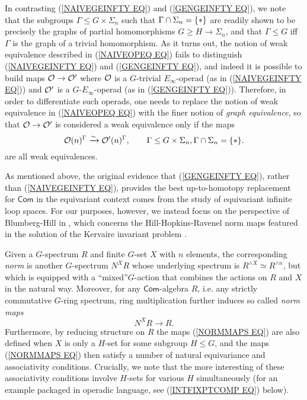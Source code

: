 \documentclass[a4paper,10pt]{article}%
\begin{document}
In contrasting 
(\ref{NAIVEGEINFTY EQ}) and (\ref{GENGEINFTY EQ}),
we note that 
the subgroups $\Gamma \leq G \times \Sigma_n$ such that $\Gamma \cap \Sigma_n = \{\**\}$ 
are readily shown to be precisely the graphs of partial homomorphisms 
$G \geq H \to \Sigma_n$,
and that $\Gamma \leq G$ iff $\Gamma$ is the graph of a trivial homomorphism. 
As it turns out, the notion of weak equivalence described in (\ref{NAIVEOPEQ EQ}) fails to distinguish
(\ref{NAIVEGEINFTY EQ}) and (\ref{GENGEINFTY EQ}), 
and indeed it is possible
to build maps $\mathcal{O} \to \mathcal{O}'$ where
$\mathcal{O}$ is a $G$-trivial $E_{\infty}$-operad (as in (\ref{NAIVEGEINFTY EQ}))
and $\mathcal{O}'$ is a $G$-$E_{\infty}$-operad 
(as in (\ref{GENGEINFTY EQ})).
Therefore, in order to differentiate such operads, one needs to replace the notion of weak equivalence in (\ref{NAIVEOPEQ EQ}) 
with the finer notion of \textit{graph equivalence}, 
so that $\mathcal{O} \to \mathcal{O}'$ is considered a weak equivalence only if
the maps
\begin{equation}\label{GENEOPEQ EQ}
	\O(n)^{\Gamma} \xrightarrow{\sim} \O'(n)^{\Gamma}, \qquad
	\Gamma \leq G\times \Sigma_n, \Gamma \cap \Sigma_n = \{\**\}.
\end{equation}
are all weak equivalences.

As mentioned above, the original evidence \cite{CW91}
that (\ref{GENGEINFTY EQ}), 
rather than (\ref{NAIVEGEINFTY EQ}), 
provides the best up-to-homotopy replacement for $\mathsf{Com}$ in the equivariant context comes from the study of equivariant infinite loop spaces. %
For our purposes, however, we instead focus on the perspective of Blumberg-Hill in \cite{BH15},
which concerns the Hill-Hopkins-Ravenel norm maps featured in the solution of the Kervaire invariant problem \cite{HHR}.

Given a $G$-spectrum $R$ and finite $G$-set $X$ with $n$ elements, 
the corresponding \textit{norm} is another $G$-spectrum $N^X R$
whose underlying spectrum is 
$R^{\wedge X} \simeq R^{\wedge n}$,
but which is equipped with a ``mixed''$G$-action that combines the actions on $R$ and $X$ in the natural way.
Moreover, for any $\mathsf{Com}$-algebra $R$, i.e.
any strictly commutative $G$-ring spectrum, 
ring multiplication further induces so called \textit{norm maps}
\begin{equation}\label{NORMMAPS EQ}
	N^X R \to R.
\end{equation}
Furthermore, by reducing structure on $R$ the maps (\ref{NORMMAPS EQ}) are also defined when $X$ is only a $H$-set for some subgroup $H \leq G$, and the maps (\ref{NORMMAPS EQ})
then satisfy a number of 
natural equivariance and associativity conditions.
Crucially,  we note that the more interesting of these associativity conditions involve $H$-sets for various $H$ simultaneously
(for an example packaged in operadic language,
see (\ref{INTFIXPTCOMP EQ}) below).
\end{document}
